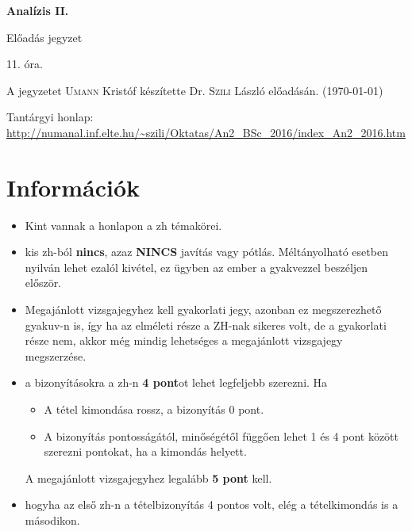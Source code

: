 \documentclass[a4paper,11.5pt]{article}
\begin{document}
	\setlength\parindent{0pt}
	\def\s{\hspace{0.2mm}\vphantom{\beta}}
	\def\Z{\mathbb{Z}}
	\def\Q{\mathbb{Q}}
	\def\R{\mathbb{R}}
	\def\C{\mathbb{C}}
	\def\N{\mathbb{N}}
	\def\Ra{\overline{\mathbb{R}}}
	
	\def\sume{\displaystyle\sum_{n=1}^{+\infty}}
	\def\sumn{\displaystyle\sum_{n=0}^{+\infty}}
	
	\def\narrow{\underset{n\rightarrow+\infty}{\longrightarrow}}
	\def\limn{\displaystyle\lim_{n\to +\infty}}
	\def\limx{\displaystyle\lim_{x\to +\infty}}
	
	
	\theoremstyle{definition}
	\newtheorem{theorem}{Tétel}[subsection] 
	
	\theoremstyle{definition}
	\newtheorem{definition}[theorem]{Definíció} 
	\newtheorem{example}[theorem]{Példa} 
	\newtheorem{task}[theorem]{Feladat} 
	\newtheorem{note}[theorem]{Megjegyzés}
	\newtheorem{revision}[theorem]{Emlékeztető}
	\begin{center}
		{\LARGE\textbf{Analízis II.}}
		
		{\Large Előadás jegyzet}
		
		11. óra.
	\end{center}
	A jegyzetet \textsc{Umann} Kristóf készítette Dr. \textsc{Szili} László  előadásán. (\today)
	
	
	Tantárgyi honlap: \url{http://numanal.inf.elte.hu/~szili/Oktatas/An2_BSc_2016/index_An2_2016.htm}
	\section{Információk}
	\begin{itemize}
		\item Kint vannak a honlapon a zh témakörei.
		\item kis zh-ból \textbf{nincs}, azaz {\LARGE\textbf{NINCS}} javítás vagy pótlás. Méltányolható esetben nyilván lehet ezalól kivétel, ez ügyben az ember a gyakvezzel beszéljen először.
		\item Megajánlott vizsgajegyhez kell gyakorlati jegy, azonban ez megszerezhető gyakuv-n is, így ha az elméleti része a ZH-nak sikeres volt, de a gyakorlati része nem, akkor még mindig lehetséges a megajánlott vizsgajegy megszerzése.
		\item a bizonyításokra a zh-n \textbf{4 pont}ot lehet legfeljebb szerezni. Ha
		\begin{itemize}
			\item A tétel kimondása rossz, a bizonyítás 0 pont.
			\item A bizonyítás pontosságától, minőségétől függően lehet 1 és 4 pont között szerezni pontokat, ha a kimondás helyett.
		\end{itemize}
		A megajánlott vizsgajegyhez legalább \textbf{5 pont} kell.
		\item hogyha az első zh-n a tételbizonyítás 4 pontos volt, elég a tételkimondás is a másodikon.
	\end{itemize}
\end{document}
